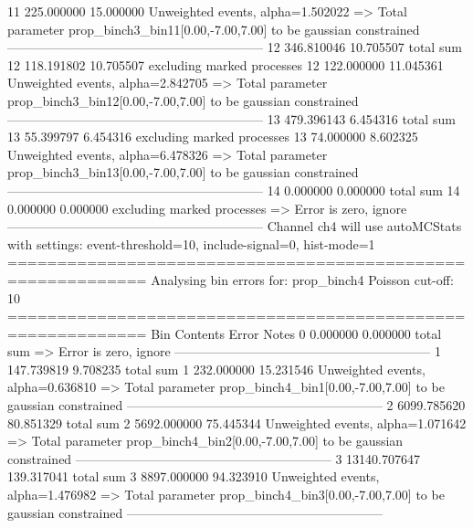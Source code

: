 11         225.000000      15.000000       Unweighted events, alpha=1.502022
  => Total parameter prop_binch3_bin11[0.00,-7.00,7.00] to be gaussian constrained
------------------------------------------------------------
12         346.810046      10.705507       total sum                     
12         118.191802      10.705507       excluding marked processes    
12         122.000000      11.045361       Unweighted events, alpha=2.842705
  => Total parameter prop_binch3_bin12[0.00,-7.00,7.00] to be gaussian constrained
------------------------------------------------------------
13         479.396143      6.454316        total sum                     
13         55.399797       6.454316        excluding marked processes    
13         74.000000       8.602325        Unweighted events, alpha=6.478326
  => Total parameter prop_binch3_bin13[0.00,-7.00,7.00] to be gaussian constrained
------------------------------------------------------------
14         0.000000        0.000000        total sum                     
14         0.000000        0.000000        excluding marked processes    
  => Error is zero, ignore      
------------------------------------------------------------
Channel ch4 will use autoMCStats with settings: event-threshold=10, include-signal=0, hist-mode=1
============================================================
Analysing bin errors for: prop_binch4
Poisson cut-off: 10
============================================================
Bin        Contents        Error           Notes                         
0          0.000000        0.000000        total sum                     
  => Error is zero, ignore      
------------------------------------------------------------
1          147.739819      9.708235        total sum                     
1          232.000000      15.231546       Unweighted events, alpha=0.636810
  => Total parameter prop_binch4_bin1[0.00,-7.00,7.00] to be gaussian constrained
------------------------------------------------------------
2          6099.785620     80.851329       total sum                     
2          5692.000000     75.445344       Unweighted events, alpha=1.071642
  => Total parameter prop_binch4_bin2[0.00,-7.00,7.00] to be gaussian constrained
------------------------------------------------------------
3          13140.707647    139.317041      total sum                     
3          8897.000000     94.323910       Unweighted events, alpha=1.476982
  => Total parameter prop_binch4_bin3[0.00,-7.00,7.00] to be gaussian constrained
------------------------------------------------------------
